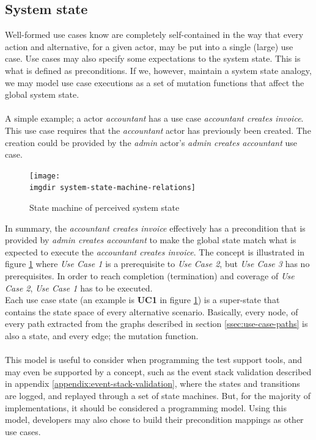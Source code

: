 \subsection{System state}
Well-formed use cases  know are completely self-contained\cite{larman2005} in the way that every action and alternative, for a given actor, may be put into a single (large) use case. Use cases may also specify some expectations to the system state. This is what is defined as preconditions. If we, however, maintain a system state analogy, we may model use case executions as a set of mutation functions that affect the global system state.\\\\
A simple example; a actor \emph{accountant} has a use case \emph{accountant creates invoice}. This use case requires that the \emph{accountant} actor has previously been created. The creation could be provided by the \emph{admin} actor's \emph{admin creates accountant} use case.
\begin{figure}[h]
\texttt{[image: \\imgdir system-state-machine-relations]}
\centering
\caption{State machine of perceived system state}
\label{fig:system-state-machine-relations}
\end{figure}
In summary, the \emph{accountant creates invoice} effectively has a precondition that is provided by \emph{admin creates accountant} to make the global state match what is expected to execute the \emph{accountant creates invoice}. The concept is illustrated in figure \ref{fig:system-state-machine-relations} where \emph{Use Case 1} is a prerequisite to \emph{Use Case 2}, but \emph{Use Case 3} has no prerequisites. In order to reach completion (termination) and coverage of \emph{Use Case 2}, \emph{Use Case 1} has to be executed.\\
Each use case state (an example is \textbf{UC1} in figure \ref{fig:system-state-machine-relations}) is a super-state that contains the state space of every alternative scenario. Basically, every node, of every path extracted from the graphs described in section \ref{ssec:use-case-paths} is also a state, and every edge; the mutation function.\\\\
This model is useful to consider when programming the test support tools, and may even be supported by a concept, such as the event stack validation described in appendix \ref{appendix:event-stack-validation}, where the states and transitions are logged, and replayed through a set of state machines. But, for the majority of implementations, it should be considered a programming model. Using this model, developers may also chose to build their precondition mappings as other use cases.


